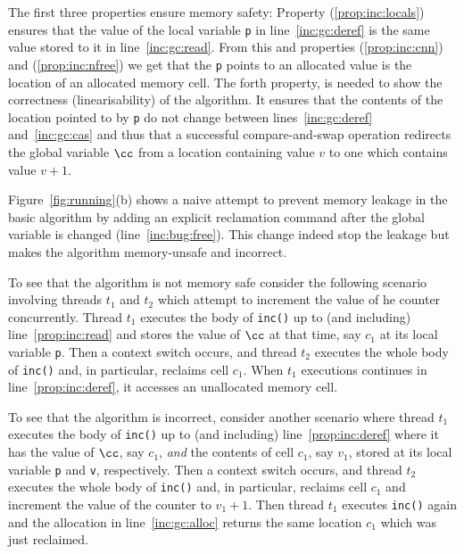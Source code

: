 The first three properties ensure memory safety:
Property (\ref{prop:inc:locals})
ensures that the value of the local variable \texttt{p} 
in line~\ref{inc:gc:deref} is the same value stored to it in line~\ref{inc:gc:read}.
From this and properties (\ref{prop:inc:cnn}) and (\ref{prop:inc:nfree}) 
we get that the \texttt{p} points to an allocated value is the location of an allocated  memory cell.
The forth property, is needed to show the correctness  (linearisability) of the algorithm.
It ensures that the contents of the location pointed to by \texttt{p} do not change 
between lines~\ref{inc:gc:deref} and~\ref{inc:gc:cas} 
and thus that a successful compare-and-swap operation 
redirects the global variable $\cc$ from a location containing value $v$ to one
which contains value $v+1$.


Figure~\ref{fig:running}(b) shows a naive attempt to prevent memory leakage
in the basic algorithm 
by adding an explicit reclamation command after the global variable is changed
(line~\ref{inc:bug:free}).
This change indeed stop the leakage but  makes the algorithm memory-unsafe and incorrect.

To see that the algorithm is not memory safe consider the following scenario
involving  threads $t_1$ and $t_2$ which attempt to increment the value of he counter concurrently.
Thread $t_1$ executes the body of \texttt{inc()} up to (and including) line~\ref{prop:inc:read}
and stores the value of $\cc$ at that time, say $c_1$ at its local variable \texttt{p}.
Then a context switch occurs, and thread $t_2$ executes the whole body of \texttt{inc()} and, 
in particular, reclaims cell $c_1$. 
When  $t_1$ executions continues in line~\ref{prop:inc:deref}, it accesses an unallocated memory cell.    

To see that the algorithm is incorrect, consider another scenario where 
thread $t_1$ executes the body of \texttt{inc()} up to (and including) line~\ref{prop:inc:deref}
where it has the value of $\cc$, say $c_1$, \emph{and} the contents of cell $c_1$, say $v_1$,
stored at its local variable \texttt{p} and \texttt{v}, respectively.
Then a context switch occurs, and thread $t_2$ executes the whole body of \texttt{inc()} and, 
in particular, reclaims cell $c_1$ and increment the value of the counter to $v_1+1$.
Then thread $t_1$ executes  \texttt{inc()} again and the allocation in line~\ref{inc:gc:alloc}
returns the same location $c_1$ which was just reclaimed. 

